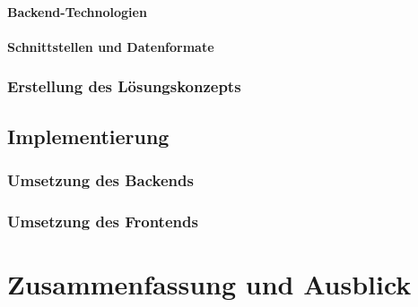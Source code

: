 \subsubsection{Backend-Technologien}
\subsubsection{Schnittstellen und Datenformate}

\subsection{Erstellung des Lösungskonzepts}

\section{Implementierung}
\subsection{Umsetzung des Backends}
\subsection{Umsetzung des Frontends}

\chapter{Zusammenfassung und Ausblick}